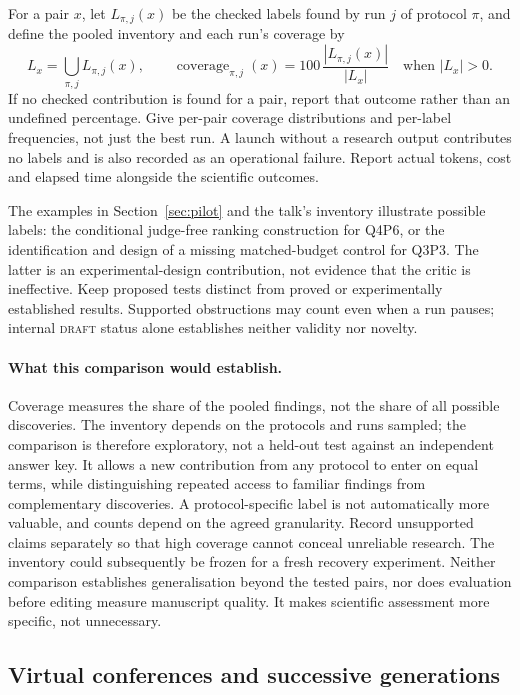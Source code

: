 \documentclass[11pt,a4paper]{article}
\newcommand{\pair}[1]{\mbox{#1}}
\newcommand{\st}[1]{\textsc{#1}}
\begin{document}
For a pair $x$, let $L_{\pi,j}(x)$ be the checked labels found by run $j$ of
protocol $\pi$, and define the pooled inventory and each run's coverage by
\[
  L_x=\bigcup_{\pi,j}L_{\pi,j}(x),
  \qquad
  \operatorname{coverage}_{\pi,j}(x)
  =100\,\frac{|L_{\pi,j}(x)|}{|L_x|}
  \quad\text{when }|L_x|>0.
\]
If no checked contribution is found for a pair, report that outcome rather
than an undefined percentage. Give per-pair coverage distributions and
per-label frequencies, not just the best run. A launch without a research
output contributes no labels and is also recorded as an operational failure.
Report actual tokens, cost and elapsed time alongside the scientific outcomes.

The examples in Section~\ref{sec:pilot} and the talk's inventory illustrate
possible labels: the conditional judge-free ranking construction for \pair{Q4P6},
or the identification and design of a missing matched-budget control for
\pair{Q3P3}. The latter is an experimental-design contribution, not evidence that
the critic is ineffective. Keep proposed tests distinct from proved or
experimentally established results. Supported obstructions may count even
when a run pauses; internal \st{draft} status alone establishes neither
validity nor novelty.

\paragraph{What this comparison would establish.}
Coverage measures the share of the pooled findings, not the share of all
possible discoveries. The inventory depends on the protocols and runs sampled;
the comparison is therefore exploratory, not a held-out test against an
independent answer key. It allows a new contribution from any protocol to
enter on equal terms, while distinguishing repeated access to familiar
findings from complementary discoveries. A protocol-specific label is not
automatically more valuable, and counts depend on the agreed granularity.
Record unsupported claims separately so that high coverage cannot conceal
unreliable research. The inventory could subsequently be frozen for a fresh
recovery experiment. Neither comparison establishes generalisation beyond
the tested pairs, nor does evaluation before editing measure manuscript
quality. It makes scientific assessment more specific, not unnecessary.

\subsection{Virtual conferences and successive generations}
\end{document}
